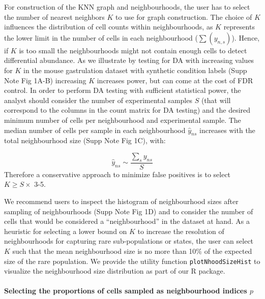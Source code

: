 \documentclass[
]{article}
\begin{document}
For construction of the KNN graph and neighbourhoods, the user has to select the number of nearest neighbors \(K\) to use for graph construction.
The choice of \(K\) influences the distribution of cell counts within neighbourhoods, as \(K\) represents the lower limit in the number of cells in each neighbourhood (\(\sum(y_{n,s})\)). Hence, if \(K\) is too small the neighbourhoods might not contain enough cells to detect differential abundance. As we illustrate by testing for DA with increasing values for \(K\) in the mouse gastrulation dataset with synthetic condition labels (Supp Note Fig 1A-B) increasing \(K\) increases power, but can come at the cost of FDR control.
In order to perform DA testing with sufficient statistical power, the analyst should consider the number of experimental samples \(S\) (that will correspond to the columns in the count matrix for DA testing) and the desired minimum number of cells per neighbourhood and experimental sample.
The median number of cells per sample in each neighbourhood \(\hat{y}_{ns}\) increases with the total neighbourhood size (Supp Note Fig 1C), with:

\[
\hat{y}_{ns} \sim \frac{\sum_s y_{ns}}{S}
\]
Therefore a conservative approach to minimize false positives is to select \(K \geq S \times\) 3-5.

We recommend users to inspect the histogram of neighbourhood sizes after sampling of neighbourhoods (Supp Note Fig 1D) and to consider the number of cells that would be considered a ``neighbourhood'' in the dataset at hand. As a heuristic for selecting a lower bound on \(K\) to increase the resolution of neighbourhoods for capturing rare sub-populations or states, the user can select \(K\) such that the mean neighbourhood size is no more than 10\% of the expected size of the rare population. We provide the utility function
\texttt{plotNhoodSizeHist} to visualize the neighbourhood size distribution as part of our R package.

\hypertarget{selecting-the-proportions-of-cells-sampled-as-neighbourhood-indices-p}{%
\paragraph*{\texorpdfstring{Selecting the proportions of cells sampled as neighbourhood indices \(p\)}{Selecting the proportions of cells sampled as neighbourhood indices p}}\label{selecting-the-proportions-of-cells-sampled-as-neighbourhood-indices-p}}
\end{document}
